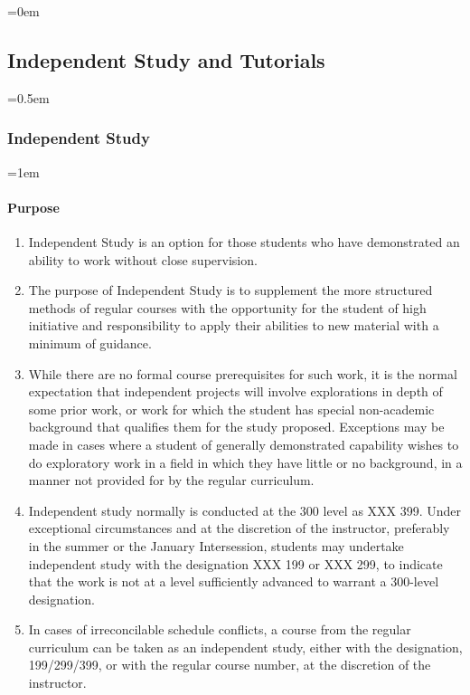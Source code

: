 \documentclass{manual}
\newcommand{\modified}[1]{}
\newcommand{\oldbreak}[1]{}
\let\oldsubsection\subsection
\renewcommand\subsection{\leftskip=0em\oldsubsection}
\let\oldsubsubsection\subsubsection
\renewcommand\subsubsection{\leftskip=0.5em\oldsubsubsection}
\let\oldparagraph\paragraph
\renewcommand\paragraph{\leftskip=1em\oldparagraph}
\newcommand{\itemLevelA}{\alph*.}
\newcommand{\itemRefA}{\alph*}
\begin{document}
\oldbreak{V-6}

\subsection{Independent Study and Tutorials}\label{sec:IndependentStudyAndTutorials}

\subsubsection{Independent Study}

\paragraph{Purpose}

\begin{enumerate}[label=\itemLevelA,ref=\itemRefA]
\item Independent Study is an option for those students who have demonstrated an ability to\modified{5/13/93} work without close supervision. 

\item The purpose of Independent Study is to supplement the more structured methods of regular courses with the opportunity for the student of high initiative and responsibility to apply their abilities to new material with a minimum of guidance. 

\item While there are no formal course prerequisites for such work, it is the normal expectation that independent projects will involve explorations in depth of some prior work, or work for which the student has special non-academic background that qualifies them\modified{10/10/89} for the study proposed. Exceptions may be made in cases where a student of generally demonstrated capability wishes to do exploratory work in a field in which they have little or no background, in a manner not provided for by the regular curriculum. 

\item Independent\modified{5/12/98} study normally is conducted at the 300 level as XXX 399. Under exceptional circumstances and at the discretion of the instructor, preferably in the summer or the January Intersession, students may undertake independent study with the designation XXX 199 or XXX 299, to indicate that the work is not at a level sufficiently advanced to warrant a 300-level designation.

\item In cases of irreconcilable schedule conflicts, a course from the regular curriculum can be taken as an independent study, either with the designation, 199/299/399, or with the regular course number, at the discretion of the instructor.
\end{enumerate}
\end{document}
